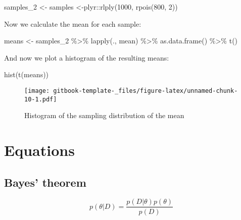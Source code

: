 \documentclass[
]{book}
\newenvironment{Shaded}{\begin{snugshade}}{\end{snugshade}}
\newcommand{\DecValTok}[1]{\textcolor[rgb]{0.00,0.00,0.81}{#1}}
\newcommand{\FunctionTok}[1]{\textcolor[rgb]{0.00,0.00,0.00}{#1}}
\newcommand{\NormalTok}[1]{#1}
\newcommand{\OtherTok}[1]{\textcolor[rgb]{0.56,0.35,0.01}{#1}}
\newcommand{\SpecialCharTok}[1]{\textcolor[rgb]{0.00,0.00,0.00}{#1}}
\begin{document}
\begin{Shaded}
\begin{Highlighting}[]
\NormalTok{samples\_2 }\OtherTok{\textless{}{-}}\NormalTok{ samples }\OtherTok{\textless{}{-}}\NormalTok{plyr}\SpecialCharTok{::}\FunctionTok{rlply}\NormalTok{(}\DecValTok{1000}\NormalTok{, }\FunctionTok{rpois}\NormalTok{(}\DecValTok{800}\NormalTok{, }\DecValTok{2}\NormalTok{))}
\end{Highlighting}
\end{Shaded}

Now we calculate the mean for each sample:

\begin{Shaded}
\begin{Highlighting}[]
\NormalTok{means }\OtherTok{\textless{}{-}}\NormalTok{ samples\_2 }\SpecialCharTok{\%\textgreater{}\%}
  \FunctionTok{lapply}\NormalTok{(., mean) }\SpecialCharTok{\%\textgreater{}\%}
  \FunctionTok{as.data.frame}\NormalTok{() }\SpecialCharTok{\%\textgreater{}\%}
  \FunctionTok{t}\NormalTok{()}
\end{Highlighting}
\end{Shaded}

And now we plot a histogram of the resulting means:

\begin{Shaded}
\begin{Highlighting}[]
\FunctionTok{hist}\NormalTok{(}\FunctionTok{t}\NormalTok{(means))}
\end{Highlighting}
\end{Shaded}

\begin{figure}
\centering
\texttt{[image: gitbook-template-\_files/figure-latex/unnamed-chunk-10-1.pdf]}
\caption{\label{fig:unnamed-chunk-10}Histogram of the sampling distribution of the mean}
\end{figure}

\hypertarget{equations}{%
\chapter{Equations}\label{equations}}

\hypertarget{bayes-theorem}{%
\section{Bayes' theorem}\label{bayes-theorem}}

\begin{equation} 
p(\theta | D) = \frac{p(D|\theta) p(\theta)} {p(D)}
\label{eq:bayes}
\end{equation}
\end{document}
